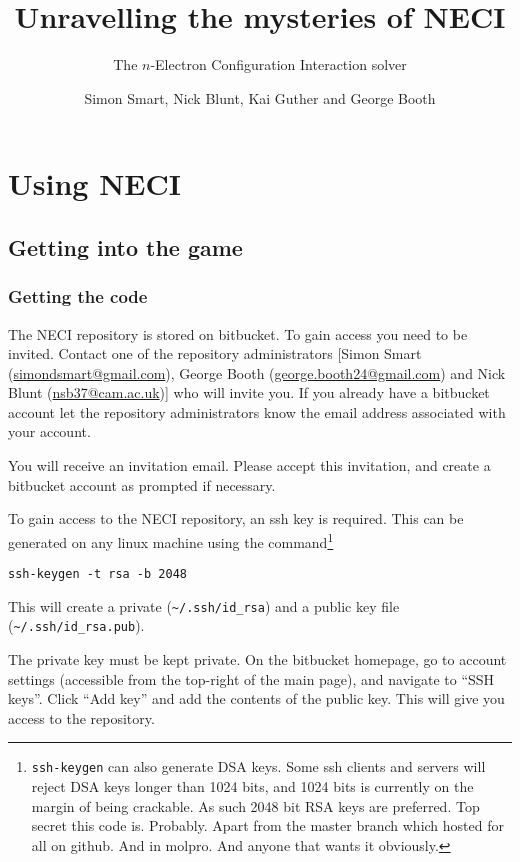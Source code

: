 \documentclass[a4paper,notitlepage,dvipsnames]{scrreprt}
\makeatletter
\let\code\lstinline
\newcommand*{\toccontents}{\@starttoc{toc}}
\makeatother
\begin{document}
\author{Simon Smart, Nick Blunt, Kai Guther and George Booth}
\title{Unravelling the mysteries of NECI}
\subtitle{The $n$-Electron Configuration Interaction solver}
\maketitle

\toccontents

\chapter{Using NECI}
\section{Getting into the game}
\subsection{Getting the code}
	The NECI repository is stored on bitbucket. To gain access you need to be
	invited. Contact one of the repository administrators
	[Simon Smart (\url{simondsmart@gmail.com}), George Booth
	(\url{george.booth24@gmail.com}) and Nick Blunt (\url{nsb37@cam.ac.uk})] who will
	invite you. If you already have a bitbucket account let the repository
	administrators know the email address associated with your account.

	You will receive an invitation email. Please accept this invitation, and
	create a bitbucket account as prompted if necessary.

	To gain access to the NECI repository, an ssh key is required. This can
	be generated on any linux machine using the command\footnote{%
		\code{ssh-keygen} can also generate DSA keys. Some ssh clients and
		servers will reject DSA keys longer than 1024 bits, and 1024 bits is
		currently on the margin of being crackable. As such 2048 bit RSA keys
		are preferred. Top secret this code is. Probably. Apart from the master branch which hosted for all on github. And in molpro.
		And anyone that wants it obviously.
	}
	\begin{lstlisting}[gobble=4]
		ssh-keygen -t rsa -b 2048
	\end{lstlisting}%
	This will create a private (\code{~/.ssh/id_rsa}) and a public key
	file (\code{~/.ssh/id_rsa.pub}).

	The private key must be kept private. On the bitbucket homepage, go to
	account settings (accessible from the top-right	of the main page), and
	navigate to ``SSH keys''. Click ``Add key'' and add the contents of the
	public key. This will give you access to the repository.
\end{document}
